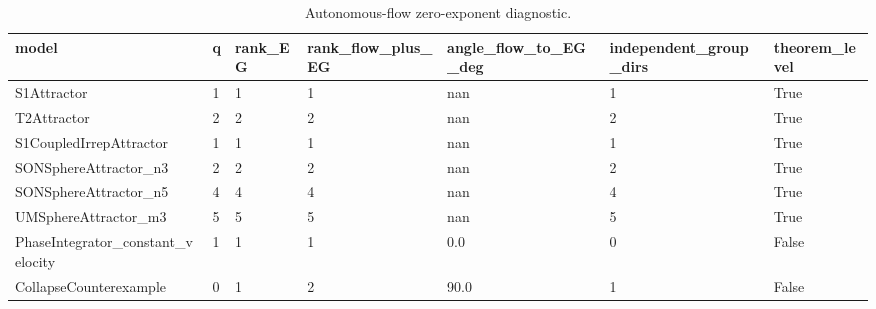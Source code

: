 \begin{table}[t]
\centering
\small
\caption{Autonomous-flow zero-exponent diagnostic.}
\label{tab:auto-zero}
\begin{tabular}{lllllll}
\toprule
model & q & rank_EG & rank_flow_plus_EG & angle_flow_to_EG_deg & independent_group_dirs & theorem_level \\
\midrule
S1Attractor & 1 & 1 & 1 & nan & 1 & True \\
T2Attractor & 2 & 2 & 2 & nan & 2 & True \\
S1CoupledIrrepAttractor & 1 & 1 & 1 & nan & 1 & True \\
SONSphereAttractor\_n3 & 2 & 2 & 2 & nan & 2 & True \\
SONSphereAttractor\_n5 & 4 & 4 & 4 & nan & 4 & True \\
UMSphereAttractor\_m3 & 5 & 5 & 5 & nan & 5 & True \\
PhaseIntegrator\_constant\_velocity & 1 & 1 & 1 & 0.0 & 0 & False \\
CollapseCounterexample & 0 & 1 & 2 & 90.0 & 1 & False \\
\bottomrule
\end{tabular}
\end{table}
